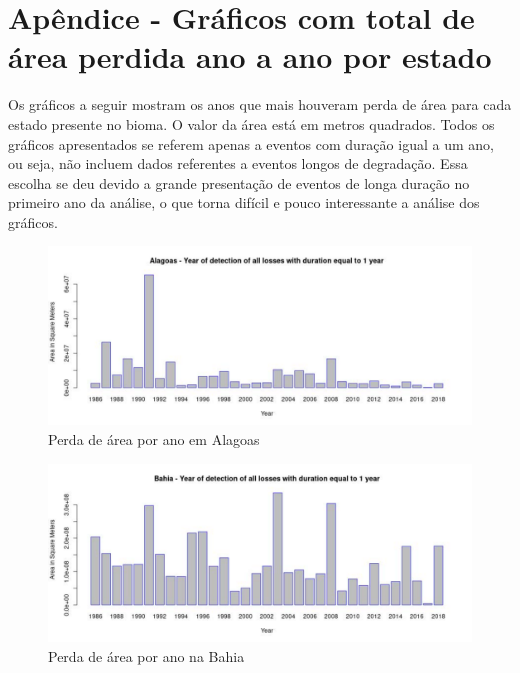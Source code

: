 \appendix 
\section{Apêndice - Gráficos com total de área perdida ano a ano por estado}

\hspace{13pt} Os gráficos a seguir mostram os anos que mais houveram perda de área para cada estado presente no bioma. O valor da área está em metros quadrados. Todos os gráficos apresentados se referem apenas a eventos com duração igual a um ano, ou seja, não incluem dados referentes a eventos longos de degradação. Essa escolha se deu devido a grande presentação de eventos de longa duração no primeiro ano da análise, o que torna difícil e pouco interessante a análise dos gráficos.

\begin{figure}[H]
    \centering
    \includegraphics[scale=.5]{images/loss_graphics/Alagoas_loss_eq1.pdf}
    \caption{Perda de área por ano em Alagoas}
    \label{fig:loss_alagoas}
\end{figure}

\begin{figure}[H]
    \centering
    \includegraphics[scale=.5]{images/loss_graphics/Bahia_loss_eq1.pdf}
    \caption{Perda de área por ano na Bahia}
    \label{fig:loss_bahia}
\end{figure}

